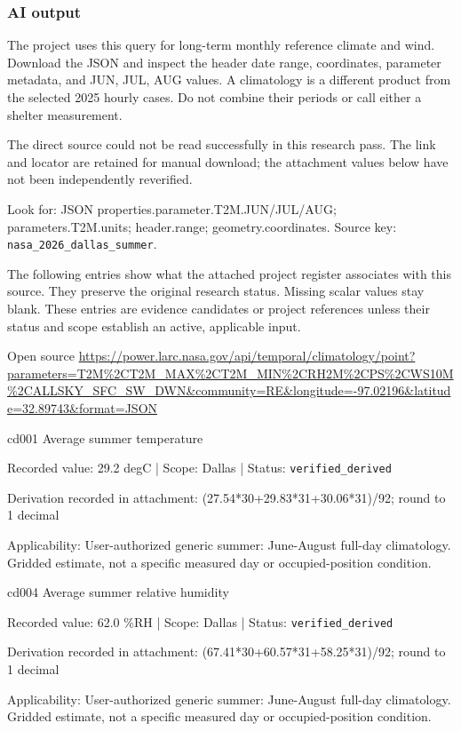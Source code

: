 \subsubsection*{AI output}
The project uses this query for long-term monthly reference climate and wind. Download the JSON and inspect the header date range, coordinates, parameter metadata, and JUN, JUL, AUG values. A climatology is a different product from the selected 2025 hourly cases. Do not combine their periods or call either a shelter measurement.

The direct source could not be read successfully in this research pass. The link and locator are retained for manual download; the attachment values below have not been independently reverified.

Look for: JSON properties.parameter.T2M.JUN/JUL/AUG; parameters.T2M.units; header.range; geometry.coordinates. Source key: \nolinkurl{nasa_2026_dallas_summer}.

The following entries show what the attached project register associates with this source. They preserve the original research status. Missing scalar values stay blank. These entries are evidence candidates or project references unless their status and scope establish an active, applicable input.

Open source  \url{https://power.larc.nasa.gov/api/temporal/climatology/point?parameters=T2M%2CT2M_MAX%2CT2M_MIN%2CRH2M%2CPS%2CWS10M%2CALLSKY_SFC_SW_DWN&community=RE&longitude=-97.02196&latitude=32.89743&format=JSON}

cd001  Average summer temperature

Recorded value: 29.2 degC | Scope: Dallas | Status: \nolinkurl{verified_derived}

Derivation recorded in attachment: (27.54*30+29.83*31+30.06*31)/92; round to 1 decimal

Applicability: User-authorized generic summer: June-August full-day climatology. Gridded estimate, not a specific measured day or occupied-position condition.

cd004  Average summer relative humidity

Recorded value: 62.0 \%RH | Scope: Dallas | Status: \nolinkurl{verified_derived}

Derivation recorded in attachment: (67.41*30+60.57*31+58.25*31)/92; round to 1 decimal

Applicability: User-authorized generic summer: June-August full-day climatology. Gridded estimate, not a specific measured day or occupied-position condition.

